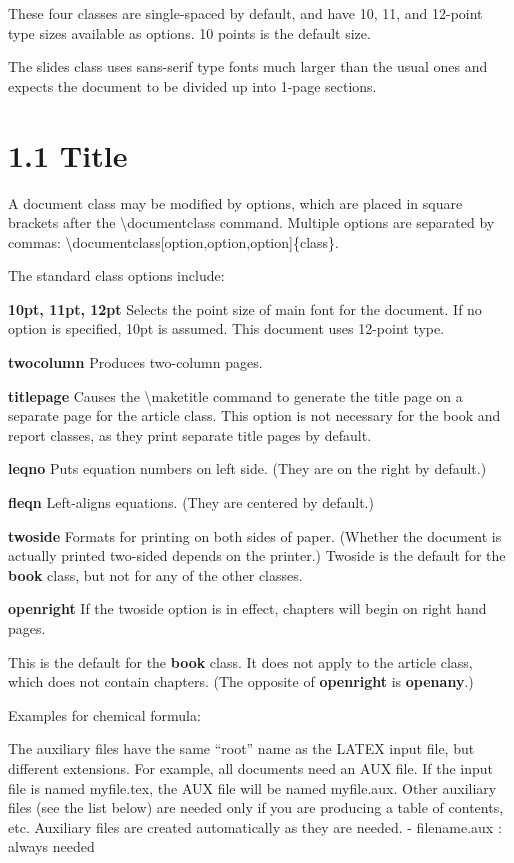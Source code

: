 \documentclass[a4paper,11pt,UTF8,openright]{book}
\begin{document}
These four classes are single-spaced by default, and have 10, 11, and 12-point type sizes
available as options. 10 points is the default size.

The slides class uses sans-serif type fonts much larger than the usual ones and expects
the document to be divided up into 1-page sections.

\section{1.1 Title}

A document class may be modified by options, which are placed in square brackets after
the \textbackslash documentclass command. Multiple options are separated by commas:
\textbackslash documentclass[option,option,option]\{class\}.

The standard class options include:

\textbf{10pt, 11pt, 12pt} Selects the point size of main font for the document. If no option is specified, 10pt is assumed. This document uses 12-point type.

\textbf{twocolumn} Produces two-column pages.

\textbf{titlepage} Causes the \textbackslash maketitle command to generate the title page on a separate page for the article class. This option is not necessary for the book and report
classes, as they print separate title pages by default.

\textbf{leqno} Puts equation numbers on left side. (They are on the right by default.)

\textbf{fleqn} Left-aligns equations. (They are centered by default.)

\textbf{twoside} Formats for printing on both sides of paper. (Whether the document is actually printed two-sided depends on the printer.) Twoside is the default for the \textbf{book} class, but not for any of the other classes.

\textbf{openright} If the twoside option is in effect, chapters will begin on right hand pages.

This is the default for the \textbf{book} class. It does not apply to the article class,
which does not contain chapters. (The opposite of \textbf{openright} is \textbf{openany}.)


\noindent Examples for chemical formula:
\vskip 0.1in



\vskip 0.1in
The auxiliary files have the same “root” name as the LATEX input file, but different
extensions. For example, all documents need an AUX file. If the input file is named
myfile.tex, the AUX file will be named myfile.aux. Other auxiliary files (see the list
below) are needed only if you are producing a table of contents, etc. Auxiliary files are
created automatically as they are needed.
\vskip 0.1in
- filename.aux : always needed
\end{document}
